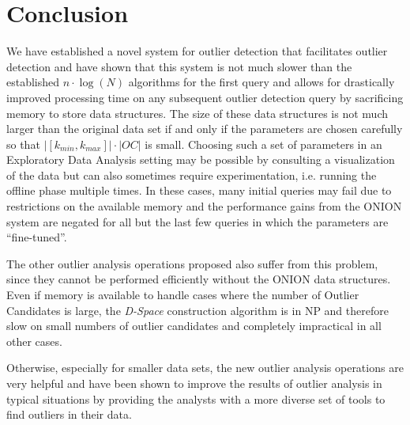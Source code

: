 \documentclass[runningheads]{llncs}
\begin{document}
\section{Conclusion}
We have established a novel system for outlier detection that facilitates outlier detection and have shown that this system is not much slower than the established $n\cdot \log(N)$ algorithms for the first query and allows for drastically improved processing time on any subsequent outlier detection query by sacrificing memory to store data structures. The size of these data structures is not much larger than the original data set if and only if the parameters are chosen carefully so that $|[k_{min},k_{max}]| \cdot |OC|$ is small. Choosing such a set of parameters in an Exploratory Data Analysis setting may be possible by consulting a visualization of the data but can also sometimes require experimentation, i.e. running the offline phase multiple times. In these cases, many initial queries may fail due to restrictions on the available memory and the performance gains from the ONION system are negated for all but the last few queries in which the parameters are ``fine-tuned''. 

The other outlier analysis operations proposed also suffer from this problem, since they cannot be performed efficiently without the ONION data structures. Even if memory is available to handle cases where the number of Outlier Candidates is large, the \emph{D-Space} construction algorithm is in NP and therefore slow on small numbers of outlier candidates and completely impractical in all other cases.

Otherwise, especially for smaller data sets, the new outlier analysis operations are very helpful and have been shown\cite{onion} to improve the results of outlier analysis in typical situations by providing the analysts with a more diverse set of tools to find outliers in their data.

%


  
\end{document}
